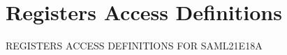 \hypertarget{group___s_a_m_l21_e18_a__reg}{}\section{Registers Access Definitions}
\label{group___s_a_m_l21_e18_a__reg}
R\+E\+G\+I\+S\+T\+E\+R\+S A\+C\+C\+E\+S\+S D\+E\+F\+I\+N\+I\+T\+I\+O\+N\+S F\+O\+R S\+A\+M\+L21\+E18\+A 